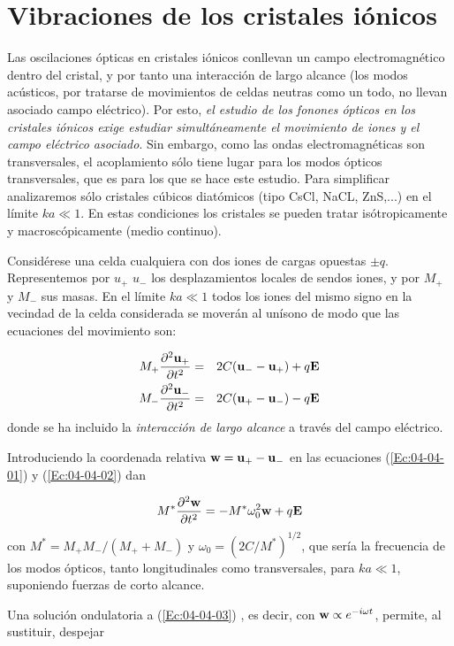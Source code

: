\section{Vibraciones de los cristales iónicos} \label{Sec:04-04}

Las oscilaciones ópticas en cristales iónicos conllevan un campo electromagnético dentro del cristal, y por tanto una interacción de largo alcance (los modos acústicos, por tratarse de movimientos de celdas neutras como un todo, no llevan asociado campo eléctrico). Por esto, \textit{el estudio de los fonones ópticos en los cristales iónicos exige estudiar simultáneamente el movimiento de iones y el campo eléctrico asociado}. Sin embargo, como las ondas electromagnéticas son transversales, el acoplamiento sólo tiene lugar para los modos ópticos transversales, que es para los que se hace este estudio. Para simplificar analizaremos sólo cristales cúbicos diatómicos (tipo CsCl, NaCL, ZnS,...) en el límite $ka\ll 1$. En estas condiciones los cristales se pueden tratar isótropicamente y macroscópicamente (medio continuo). 

Considérese una celda cualquiera con dos iones de cargas opuestas $\pm q$. Representemos por $u_+$ $u_-$ los desplazamientos locales de sendos iones, y por $M_+$ y $M_-$ sus masas. En el límite $ka\ll 1$ todos los iones del mismo signo en la vecindad de la celda considerada se moverán al unísono de modo que las ecuaciones del movimiento son:

\begin{eqnarray}
	M_+ \frac{\partial ^2 \mathbf{u}_+}{\partial t^2} & = & 2C(\mathbf{u}_- - \mathbf{u}_+) + q \mathbf{E} \label{Ec:04-04-01}\\
	M_- \frac{\partial ^2 \mathbf{u}_-}{\partial t^2} & = & 2C(\mathbf{u}_+ - \mathbf{u}_-) - q \mathbf{E} \label{Ec:04-04-02}
\end{eqnarray}
donde se ha incluido la \textit{interacción de largo alcance} a través del campo eléctrico. 

Introduciendo la coordenada relativa $\mathbf{w} = \mathbf{u}_+ - \mathbf{u}_-$ en las ecuaciones (\ref{Ec:04-04-01}) y (\ref{Ec:04-04-02}) dan

\begin{equation}
	M^* \frac{\partial ^2 \mathbf{w}}{\partial t^2} = - M^*  \omega_0^2 \mathbf{w} + q \mathbf{E} \label{Ec:04-04-03}
\end{equation}
con $M^*=M_+M_-/(M_++M_-)$ y $\omega_0=(2C/M^*)^{1/2}$, que sería la frecuencia de los modos ópticos, tanto longitudinales como transversales, para $ka\ll 1$, suponiendo fuerzas de corto alcance. 

Una solución ondulatoria a (\ref{Ec:04-04-03}) , es decir, con $\mathbf{w}\propto e^{-i\omega t}$, permite, al sustituir, despejar

